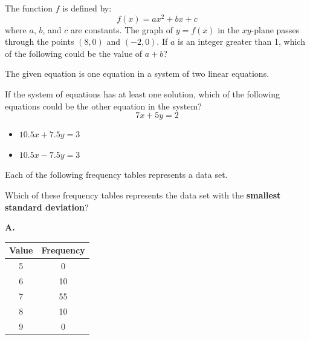 \noindent\markforreview
\vspace{1em}

The function \(f\) is defined by:
\[
f(x) = ax^2 + bx + c
\]
where \(a\), \(b\), and \(c\) are constants. The graph of \(y = f(x)\) in the \(xy\)-plane passes through the points \((8, 0)\) and \((-2, 0)\). If \(a\) is an integer greater than 1, which of the following could be the value of \(a + b\)?

\vspace{0.75em}


\vspace{2em}
\newpage

\noindent\markforreview
\vspace{1em}

The given equation is one equation in a system of two linear equations.

If the system of equations has at least one solution, which of the following equations could be the other equation in the system?
\[
7x + 5y = 2
\]

\begin{itemize}
\item[I] \(10.5x + 7.5y = 3\)
\item[II] \(10.5x - 7.5y = 3\)
\end{itemize}

\vspace{0.75em}


\vspace{2em}
\newpage

\noindent\markforreview
\vspace{1em}

Each of the following frequency tables represents a data set.

Which of these frequency tables represents the data set with the \textbf{smallest standard deviation}?

\vspace{0.75em}

\textbf{A.}
\begin{tabular}{|c|c|}
\hline
Value & Frequency \\
\hline
5 & 0 \\
6 & 10 \\
7 & 55 \\
8 & 10 \\
9 & 0 \\
\hline
\end{tabular}

